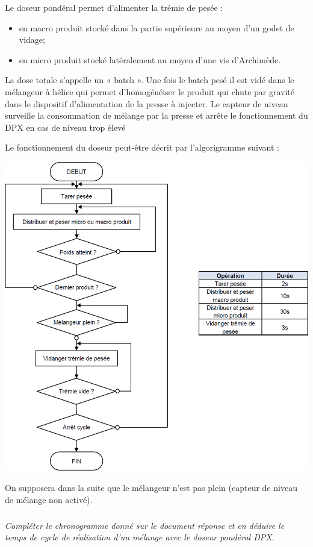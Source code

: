 \documentclass[10pt]{article}
\begin{document}
Le doseur pondéral permet d’alimenter la trémie de pesée :
\begin{itemize}
\item en macro produit stocké dans la partie supérieure au moyen d’un godet de vidage;
\item en micro produit stocké latéralement au moyen d’une vis d’Archimède.
\end{itemize}

La dose totale s’appelle un « batch ». Une fois le batch pesé il est vidé dans le mélangeur à hélice
qui permet d’homogénéiser le produit qui chute par gravité dans le dispositif d’alimentation de
la presse à injecter. Le capteur de niveau surveille la consommation de mélange par la presse et
arrête le fonctionnement du DPX en cas de niveau trop élevé

Le fonctionnement du doseur peut-être décrit par l’algorigramme suivant :

\begin{center}
\includegraphics[width=.75\textwidth]{images/fig_03}
\end{center}

\begin{hypo}
On supposera dans la suite que le mélangeur n’est pas plein (capteur de
niveau de mélange non activé).
\end{hypo}

\subparagraph{}
\textit{Compléter le chronogramme donné sur le document réponse et en déduire le temps de
cycle de réalisation d’un mélange avec le doseur pondéral DPX.}
\end{document}
